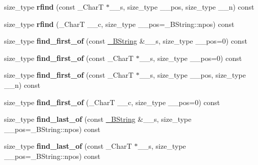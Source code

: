 \begin{DoxyCompactItemize}
size\+\_\+type {\bfseries rfind} (const \+\_\+\+CharT $\ast$\+\_\+\+\_\+s, size\+\_\+type \+\_\+\+\_\+pos, size\+\_\+type \+\_\+\+\_\+n) const
\item 
\mbox{\label{class____bstr__sum_a2e3c350141731666a960f074c46d7902}} 
size\+\_\+type {\bfseries rfind} (\+\_\+\+CharT \+\_\+\+\_\+c, size\+\_\+type \+\_\+\+\_\+pos=\+\_\+\+B\+String\+::npos) const
\item 
\mbox{\label{class____bstr__sum_a50d8c74b2811433809e61969ae4fc03b}} 
size\+\_\+type {\bfseries find\+\_\+first\+\_\+of} (const \hyperlink{classbasic__string}{\+\_\+\+B\+String} \&\+\_\+\+\_\+s, size\+\_\+type \+\_\+\+\_\+pos=0) const
\item 
\mbox{\label{class____bstr__sum_ad421e25c6c36726fd3fe81c497a41724}} 
size\+\_\+type {\bfseries find\+\_\+first\+\_\+of} (const \+\_\+\+CharT $\ast$\+\_\+\+\_\+s, size\+\_\+type \+\_\+\+\_\+pos=0) const
\item 
\mbox{\label{class____bstr__sum_a834a51fef3132c670594575c98aeabca}} 
size\+\_\+type {\bfseries find\+\_\+first\+\_\+of} (const \+\_\+\+CharT $\ast$\+\_\+\+\_\+s, size\+\_\+type \+\_\+\+\_\+pos, size\+\_\+type \+\_\+\+\_\+n) const
\item 
\mbox{\label{class____bstr__sum_a94788e193d43bd60fc267fd32ea5d9e0}} 
size\+\_\+type {\bfseries find\+\_\+first\+\_\+of} (\+\_\+\+CharT \+\_\+\+\_\+c, size\+\_\+type \+\_\+\+\_\+pos=0) const
\item 
\mbox{\label{class____bstr__sum_aebe6e86144cfe9f4498a1aab29606307}} 
size\+\_\+type {\bfseries find\+\_\+last\+\_\+of} (const \hyperlink{classbasic__string}{\+\_\+\+B\+String} \&\+\_\+\+\_\+s, size\+\_\+type \+\_\+\+\_\+pos=\+\_\+\+B\+String\+::npos) const
\item 
\mbox{\label{class____bstr__sum_a871321086d1b70a279538cf91bb24396}} 
size\+\_\+type {\bfseries find\+\_\+last\+\_\+of} (const \+\_\+\+CharT $\ast$\+\_\+\+\_\+s, size\+\_\+type \+\_\+\+\_\+pos=\+\_\+\+B\+String\+::npos) const
\item 
\mbox{\label{class____bstr__sum_a18007973373b889ca87b6cbd5cd23f50}} 

\end{DoxyCompactItemize}
